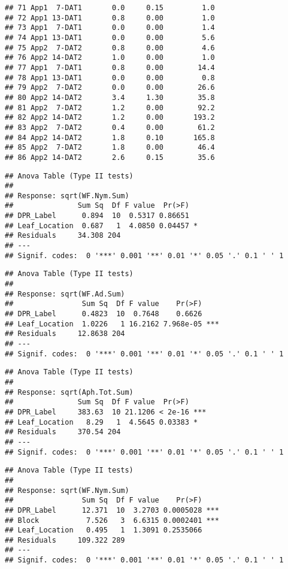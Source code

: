 \documentclass[
]{article}
\begin{document}
\begin{verbatim}
## 71 App1  7-DAT1       0.0     0.15         1.0
## 72 App1 13-DAT1       0.8     0.00         1.0
## 73 App1  7-DAT1       0.0     0.00         1.4
## 74 App1 13-DAT1       0.0     0.00         5.6
## 75 App2  7-DAT2       0.8     0.00         4.6
## 76 App2 14-DAT2       1.0     0.00         1.0
## 77 App1  7-DAT1       0.8     0.00        14.4
## 78 App1 13-DAT1       0.0     0.00         0.8
## 79 App2  7-DAT2       0.0     0.00        26.6
## 80 App2 14-DAT2       3.4     1.30        35.8
## 81 App2  7-DAT2       1.2     0.00        92.2
## 82 App2 14-DAT2       1.2     0.00       193.2
## 83 App2  7-DAT2       0.4     0.00        61.2
## 84 App2 14-DAT2       1.8     0.10       165.8
## 85 App2  7-DAT2       1.8     0.00        46.4
## 86 App2 14-DAT2       2.6     0.15        35.6
\end{verbatim}

\begin{verbatim}
## Anova Table (Type II tests)
## 
## Response: sqrt(WF.Nym.Sum)
##               Sum Sq  Df F value  Pr(>F)  
## DPR_Label      0.894  10  0.5317 0.86651  
## Leaf_Location  0.687   1  4.0850 0.04457 *
## Residuals     34.308 204                  
## ---
## Signif. codes:  0 '***' 0.001 '**' 0.01 '*' 0.05 '.' 0.1 ' ' 1
\end{verbatim}

\begin{verbatim}
## Anova Table (Type II tests)
## 
## Response: sqrt(WF.Ad.Sum)
##                Sum Sq  Df F value    Pr(>F)    
## DPR_Label      0.4823  10  0.7648    0.6626    
## Leaf_Location  1.0226   1 16.2162 7.968e-05 ***
## Residuals     12.8638 204                      
## ---
## Signif. codes:  0 '***' 0.001 '**' 0.01 '*' 0.05 '.' 0.1 ' ' 1
\end{verbatim}

\begin{verbatim}
## Anova Table (Type II tests)
## 
## Response: sqrt(Aph.Tot.Sum)
##               Sum Sq  Df F value  Pr(>F)    
## DPR_Label     383.63  10 21.1206 < 2e-16 ***
## Leaf_Location   8.29   1  4.5645 0.03383 *  
## Residuals     370.54 204                    
## ---
## Signif. codes:  0 '***' 0.001 '**' 0.01 '*' 0.05 '.' 0.1 ' ' 1
\end{verbatim}

\begin{verbatim}
## Anova Table (Type II tests)
## 
## Response: sqrt(WF.Nym.Sum)
##                Sum Sq  Df F value    Pr(>F)    
## DPR_Label      12.371  10  3.2703 0.0005028 ***
## Block           7.526   3  6.6315 0.0002401 ***
## Leaf_Location   0.495   1  1.3091 0.2535066    
## Residuals     109.322 289                      
## ---
## Signif. codes:  0 '***' 0.001 '**' 0.01 '*' 0.05 '.' 0.1 ' ' 1
\end{verbatim}
\end{document}
